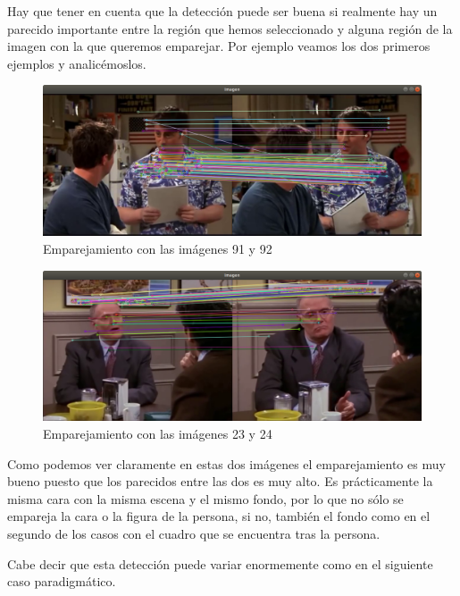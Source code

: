 \documentclass[12pt,a4paper]{article}
\begin{document}
\vspace{10px}

Hay que tener en cuenta que la detección puede ser buena si realmente hay un parecido importante entre la región que hemos seleccionado y alguna región de la imagen con la que queremos emparejar. Por ejemplo veamos los dos primeros ejemplos y analicémoslos.

\begin{figure}[H]
  \centering
  \includegraphics[scale=0.35]{./Imagenes/Ejercicio1-1.png}
  \caption{Emparejamiento con las imágenes 91 y 92}
\end{figure}

\begin{figure}[H]
  \centering
  \includegraphics[scale=0.35]{./Imagenes/Ejercicio1-2.png}
  \caption{Emparejamiento con las imágenes 23 y 24}
\end{figure}

Como podemos ver claramente en estas dos imágenes el emparejamiento es muy bueno puesto que los parecidos entre las dos es muy alto. Es prácticamente la misma cara con la misma escena y el mismo fondo, por lo que no sólo se empareja la cara o la figura de la persona, si no, también el fondo como en el segundo de los casos con el cuadro que se encuentra tras la persona.

\vspace{10px}

Cabe decir que esta detección puede variar enormemente como en el siguiente caso paradigmático.
\end{document}
